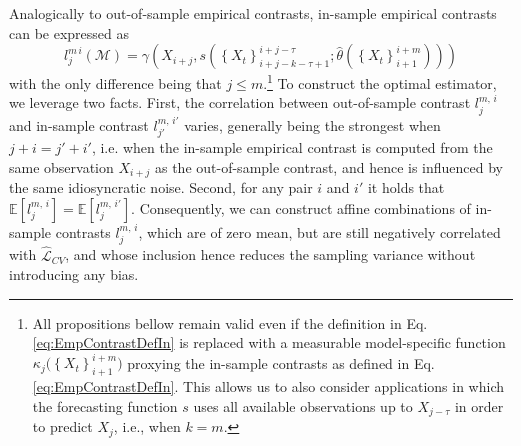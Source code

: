 \documentclass[11pt,dvipsnames]{article}
\begin{document}
Analogically to out-of-sample empirical contrasts, in-sample empirical contrasts can be expressed as
\begin{equation}\label{eq:EmpContrastDefIn} 
l_{j}^{m\,i}\left(\mathcal{M} \right)=\gamma\left( X_{i+j}, s\left(\left\lbrace X_{t} \right\rbrace_{i+j-k-\tau+1}^{i+j-\tau}; \widehat{\theta}\left(  \left\lbrace X_{t} \right\rbrace_{i+1}^{i+m} \right)\right)   \right) 
\end{equation}
with the only difference being that $ j \leq m $.\footnote{All propositions bellow remain valid even if the definition in Eq. \ref{eq:EmpContrastDefIn} is replaced with a measurable model-specific function $ \kappa_{j}\big(  \left\lbrace X_{t} \right\rbrace_{i+1}^{i+m}\big) $ proxying the in-sample contrasts as defined in Eq. \ref{eq:EmpContrastDefIn}. This allows us to also consider applications in which the forecasting function $ s $ uses all available observations up to $ X_{j-\tau} $ in order to predict $ X_{j} $, i.e., when $ k=m $.} To construct the optimal estimator, we leverage two facts. First, the correlation between out-of-sample contrast $ l_{j}^{m,\,i } $ and in-sample contrast $ l_{j'}^{m,\,i' } $ varies, generally being the strongest when $ j + i = j' + i' $, i.e. when the in-sample empirical contrast is computed from the same observation $ X_{i+j} $ as the out-of-sample contrast, and hence is influenced by the same idiosyncratic noise. Second, for any pair $ i $ and $ i' $ it holds that $ \mathbb{E}[l_{j}^{m,\,i }]=\mathbb{E}[l_{j}^{m,\,i' }] $. Consequently, we can construct affine combinations of in-sample contrasts $ l_{j}^{m,\,i } $, which are of zero mean, but are still negatively correlated with $ \widehat{\mathcal{L}}_{CV} $, and whose inclusion hence reduces the sampling variance without introducing any bias. 
\end{document}
